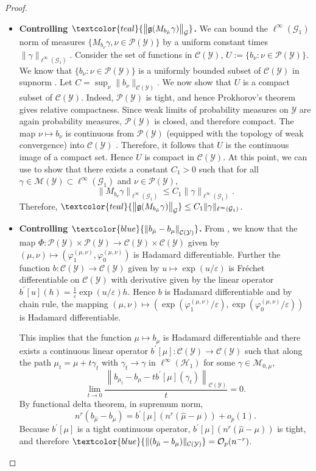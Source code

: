 \documentclass{article}
\theoremstyle{plain}
\theoremstyle{definition}
\theoremstyle{remark}
\newcommand{\cH}{\mathcal{H}}
\newcommand{\cP}{\mathcal{P}}
\newcommand{\cG}{\mathcal{G}}
\newcommand{\cC}{\mathcal{C}}
\newcommand{\cO}{\mathcal{O}}
\newcommand{\cM}{\mathcal{M}}
\newcommand{\cY}{\mathcal{Y}}
\newcommand{\1}{\mathbbm{1}}
\newcommand{\eps}{\varepsilon}
\newcommand{\norm}[1]{\left \| #1 \right \|}
\theoremstyle{plain}
\theoremstyle{definition}
\begin{document}
\begin{proof}
    \begin{itemize}
        \item \textbf{Controlling $\textcolor{teal}{\norm{\mathfrak{g}(M_{b_{\hat{\mu}}} \gamma)}_{\cG}}$.} We can bound the $\ell^\infty(\cG_1)$ norm of measures $\{M_{b_\nu} \gamma, \nu \in \cP(\cY)\}$ by a uniform constant times $\|\gamma\|_{\ell^\infty(\cG_1)}$. Consider the set of functions in $\cC(\cY)$, $U := \{{b_\nu}: \nu \in \cP(\cY)\}$. We know that $\{b_\nu: \nu \in \cP(\cY)\}$ is a uniformly bounded subset of $\cC(\cY)$ in supnorm \citep[Lem.~1]{goldfeld2024limit}. Let $C = \sup_{\nu}\|b_\nu\|_{\cC(\cY)}$.
    We now show that \(U\) is a compact subset of $\cC(\cY)$. Indeed, \(\cP(\cY)\) is tight, and hence Prokhorov's theorem \citep[Thm.~5.1]{billingsley2013convergence} gives relative compactness. Since weak limits of probability measures on \(\cY\) are again probability measures, \(\cP(\cY)\) is closed, and therefore compact. The map $\nu \mapsto {b_\nu}$ is continuous from \(\cP(\cY)\) (equipped with the topology of weak convergence) into \(\cC(\cY)\) \citep[Lem.~1]{goldfeld2024limit}. 
    Therefore, it follows that $U$ is the continuous image of a compact set. Hence $U$ is compact in \(\cC(\cY)\). At this point, we can use \citet[Lem.~22]{kokot2025coreset} to show that there exists a constant $C_1 > 0$ such that for all $\gamma \in \cM(\cY) \subset \ell^\infty(\cG_1)$ and $\nu\in \cP(\cY)$,
    \[
    \| M_{b_\nu} \gamma \|_{\ell^\infty(\cG_1)} \leq C_1 \| \gamma \|_{\ell^\infty(\cG_1)}.
    \]
    Therefore, $\textcolor{teal}{\norm{\mathfrak{g}(M_{b_{\hat{\mu}}} \gamma)}_{\cG}}\leq C_1 \|\gamma\|_{\ell^\infty(\cG_1)}$.

    \item \textbf{Controlling $\textcolor{blue}{\norm{b_{\hat{\mu}} - b_{{\mu}} }_{\cC(\cY)}}$.} From \citet[Thm.~3]{goldfeld2024limit}, we know that the map $\Phi: \cP(\cY) \times \cP(\cY) \to \cC(\cY) \times \cC(\cY)$ given by $(\mu, \nu) \mapsto (\varphi_1^{(\mu, \nu)}, \varphi_0^{(\mu, \nu)})$ is Hadamard differentiable. Further the function $b: \cC(\cY) \to \cC(\cY)$ given by $u \mapsto \exp(u/\eps)$ is Fréchet differentiable on $\cC(\cY)$ with derivative given by the linear operator $b^\prime [u](h) = \tfrac{1}{\eps} \exp(u/\eps) h$. Hence $b$ is Hadamard differentiable and by chain rule, the mapping $(\mu, \nu) \mapsto (\exp(\varphi_1^{(\mu, \nu)} / \eps), \exp(\varphi_0^{(\mu, \nu)} / \eps))$ is Hadamard differentiable. 
    
    This implies that the function $\mu \mapsto b_\mu$ is Hadamard differentiable and there exists a continuous linear operator $b^\prime[\mu]: \cC(\cY) \to \cC(\cY)$ such that along the path $\mu_t = \mu + t \gamma_t$ with $\gamma_t \to \gamma$ in $\ell^\infty(\cH_1)$ for some $\gamma \in \cM_{0, \mu}$,
    \[
    \lim_{t \to 0} \frac{\norm{b_{\mu_t} - b_\mu - t b^\prime[\mu](\gamma_t)}_{\cC(\cY)}}{t} = 0.
    \]
    By functional delta theorem, in supremum norm,
    \[
    n^r(b_{\hat{\mu}} - b_\mu) = b^\prime[\mu](n^r (\hat{\mu} - \mu)) + o_p(1).
    \]
    Because $b^\prime[\mu]$ is a tight continuous operator, $b^\prime[\mu](n^r (\hat{\mu} - \mu))$ is tight, and therefore $\textcolor{blue}{\| (b_{\hat{\mu}} - b_\mu)\|_{\cC(\cY)}} = \cO_p(n^{-r})$. 
    

\end{itemize}
\end{proof}
\end{document}
